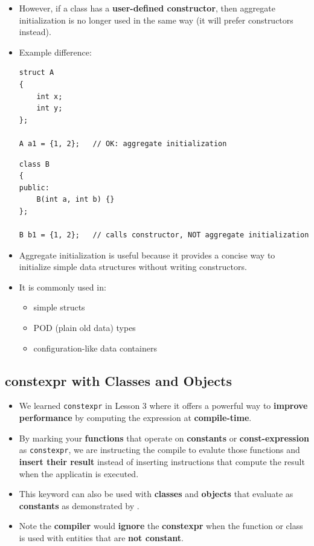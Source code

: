 \documentclass[10pt]{article}
\begin{document}
\begin{itemize}
    \item However, if a class has a \textbf{user-defined constructor}, then
    aggregate initialization is no longer used in the same way (it will prefer constructors instead).

    \item Example difference:

\begin{verbatim}
struct A
{
    int x;
    int y;
};

A a1 = {1, 2};   // OK: aggregate initialization
\end{verbatim}

\begin{verbatim}
class B
{
public:
    B(int a, int b) {}
};

B b1 = {1, 2};   // calls constructor, NOT aggregate initialization
\end{verbatim}

    \item Aggregate initialization is useful because it provides a concise way
    to initialize simple data structures without writing constructors.

    \item It is commonly used in:
    \begin{itemize}
        \item simple structs
        \item POD (plain old data) types
        \item configuration-like data containers
    \end{itemize}
\end{itemize}


\newpage
\subsection{constexpr with Classes and Objects}
\begin{itemize}
	\item We learned \verb|constexpr| in Lesson 3 where it offers a powerful way to \textbf{improve performance} by computing the expression at \textbf{compile-time}.

	\item By marking your \textbf{functions} that operate on \textbf{constants} or \textbf{const-expression} as \verb|constexpr|, we are instructing the compile to evalute those functions and \textbf{insert their result} instead of inserting instructions that compute the result when the applicatin is executed.

	\item This keyword can also be used with \textbf{classes} and \textbf{objects} that evaluate as \textbf{constants} as demonstrated by .

	\item Note the \textbf{compiler} would \textbf{ignore} the \textbf{constexpr} when the function or class is used with entities that are \textbf{not constant}.
\end{itemize}
\end{document}
